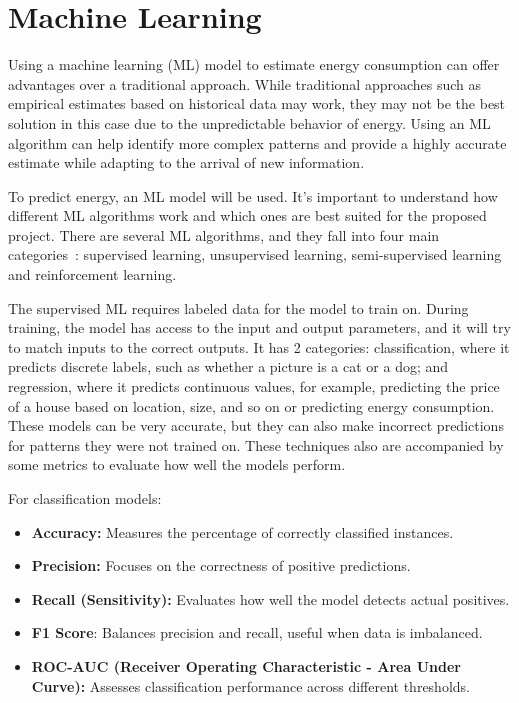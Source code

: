 \section{Machine Learning} \label{sec:background_machine_learning}

Using a machine learning (ML) model to estimate energy consumption can offer advantages over a traditional approach. While traditional approaches such as empirical estimates based on historical data may work, they may not be the best solution in this case due to the unpredictable behavior of energy. Using an ML algorithm can help identify more complex patterns and provide a highly accurate estimate while adapting to the arrival of new information.

To predict energy, an ML model will be used. It's important to understand how different ML algorithms work and which ones are best suited for the proposed project. There are several ML algorithms, and they fall into four main categories~\cite{sarker2021machine}: supervised learning, unsupervised learning, semi-supervised learning and reinforcement learning.

The supervised ML requires labeled data for the model to train on. During training, the model has access to the input and output parameters, and it will try to match inputs to the correct outputs. It has 2 categories: classification, where it predicts discrete labels, such as whether a picture is a cat or a dog; and regression, where it predicts continuous values, for example, predicting the price of a house based on location, size, and so on or predicting energy consumption. These models can be very accurate, but they can also make incorrect predictions for patterns they were not trained on. These techniques also are accompanied by some metrics to evaluate how well the models perform.



For classification models:
\begin{itemize}
    \item \textbf{Accuracy:} Measures the percentage of correctly classified instances.
    \item \textbf{Precision:} Focuses on the correctness of positive predictions.
    \item \textbf{Recall (Sensitivity):} Evaluates how well the model detects actual positives.
    \item \textbf{F1 Score}: Balances precision and recall, useful when data is imbalanced.
    \item \textbf{ROC-AUC (Receiver Operating Characteristic - Area Under Curve):} Assesses classification performance across different thresholds.
\end{itemize}

